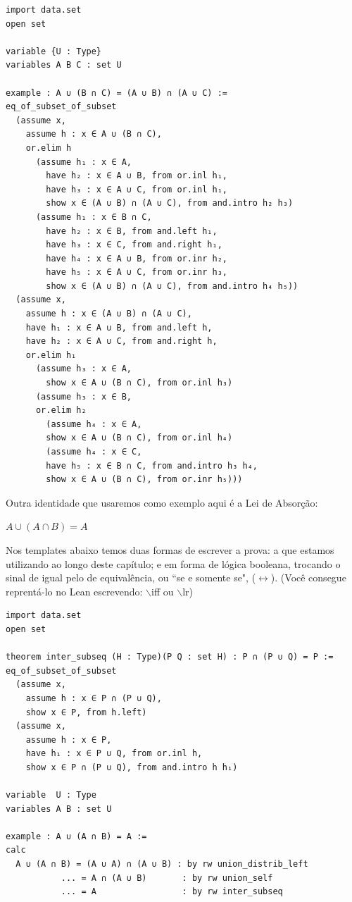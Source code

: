 \begin{lstlisting}
import data.set
open set

variable {U : Type}
variables A B C : set U

example : A ∪ (B ∩ C) = (A ∪ B) ∩ (A ∪ C) :=
eq_of_subset_of_subset
  (assume x,
    assume h : x ∈ A ∪ (B ∩ C),
    or.elim h
      (assume h₁ : x ∈ A,
        have h₂ : x ∈ A ∪ B, from or.inl h₁,
        have h₃ : x ∈ A ∪ C, from or.inl h₁,
        show x ∈ (A ∪ B) ∩ (A ∪ C), from and.intro h₂ h₃)
      (assume h₁ : x ∈ B ∩ C,
        have h₂ : x ∈ B, from and.left h₁,
        have h₃ : x ∈ C, from and.right h₁,
        have h₄ : x ∈ A ∪ B, from or.inr h₂,
        have h₅ : x ∈ A ∪ C, from or.inr h₃,
        show x ∈ (A ∪ B) ∩ (A ∪ C), from and.intro h₄ h₅))
  (assume x,
    assume h : x ∈ (A ∪ B) ∩ (A ∪ C),
    have h₁ : x ∈ A ∪ B, from and.left h,
    have h₂ : x ∈ A ∪ C, from and.right h,
    or.elim h₁
      (assume h₃ : x ∈ A,
        show x ∈ A ∪ (B ∩ C), from or.inl h₃)
      (assume h₃ : x ∈ B,
      or.elim h₂
        (assume h₄ : x ∈ A,
        show x ∈ A ∪ (B ∩ C), from or.inl h₄)
        (assume h₄ : x ∈ C,
        have h₅ : x ∈ B ∩ C, from and.intro h₃ h₄, 
        show x ∈ A ∪ (B ∩ C), from or.inr h₅)))
\end{lstlisting}

Outra identidade que usaremos como exemplo aqui é a Lei de Absorção:  

\begin{center}
    $A \cup (A \cap B) = A$
\end{center}

Nos templates abaixo temos duas formas de escrever a prova: a que estamos utilizando ao longo deste capítulo; e em forma de lógica booleana, trocando o sinal de igual pelo de equivalência, ou ``se e somente se", ($\leftrightarrow$). (Você consegue reprentá-lo no Lean escrevendo: $\backslash$iff ou $\backslash$lr)

\begin{lstlisting}
import data.set
open set

theorem inter_subseq (H : Type)(P Q : set H) : P ∩ (P ∪ Q) = P :=
eq_of_subset_of_subset
  (assume x,
    assume h : x ∈ P ∩ (P ∪ Q),
    show x ∈ P, from h.left)
  (assume x,
    assume h : x ∈ P,
    have h₁ : x ∈ P ∪ Q, from or.inl h,
    show x ∈ P ∩ (P ∪ Q), from and.intro h h₁)

variable  U : Type
variables A B : set U

example : A ∪ (A ∩ B) = A :=
calc
  A ∪ (A ∩ B) = (A ∪ A) ∩ (A ∪ B) : by rw union_distrib_left
           ... = A ∩ (A ∪ B)       : by rw union_self
           ... = A                 : by rw inter_subseq
\end{lstlisting}

